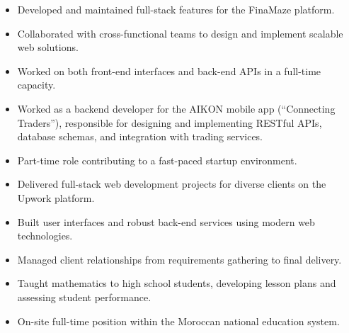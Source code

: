 \documentclass[10pt,a4paper,ragged2e,withhyper]{altacv}
\begin{document}

\begin{fullwidth}
\makecvheader
\end{fullwidth}


\begin{itemize}
\item Developed and maintained full-stack features for the FinaMaze platform.
\item Collaborated with cross-functional teams to design and implement scalable web solutions.
\item Worked on both front-end interfaces and back-end APIs in a full-time capacity.
\end{itemize}
\divider

\begin{itemize}
\item Worked as a backend developer for the AIKON mobile app (``Connecting Traders''), responsible for designing and implementing RESTful APIs, database schemas, and integration with trading services.
\item Part-time role contributing to a fast-paced startup environment.
\end{itemize}
\divider

\begin{itemize}
\item Delivered full-stack web development projects for diverse clients on the Upwork platform.
\item Built user interfaces and robust back-end services using modern web technologies.
\item Managed client relationships from requirements gathering to final delivery.
\end{itemize}
\divider

\begin{itemize}
\item Taught mathematics to high school students, developing lesson plans and assessing student performance.
\item On-site full-time position within the Moroccan national education system.
\end{itemize}
\end{document}
